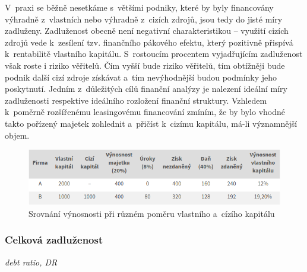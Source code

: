 V~praxi se běžně nesetkáme s~většími podniky, které by byly financovány výhradně z~vlastních nebo výhradně z~cizích zdrojů, jsou tedy do jisté míry zadluženy. Zadluženost obecně není negativní charakteristikou -- využití cizích zdrojů vede k~zesílení tzv. finančního pákového efektu, který pozitivně přispívá k~rentabilitě vlastního kapitálu.\cite{kisling} S~rostoucím procentem vyjadřujícím zadluženost však roste i riziko věřitelů. Čím vyšší bude riziko věřitelů, tím obtížněji bude podnik další cizí zdroje získávat a~tím nevýhodnější budou podmínky jeho poskytnutí.\cite{mendelu} Jedním z~důležitých cílů finanční analýzy je nalezení ideální míry zadluženosti respektive ideálního rozložení finanční struktury. Vzhledem k~poměrně rozšířenému leasingovému financování zmíním, že by bylo vhodné takto pořízený majetek zohlednit a~přičíst k~cizímu kapitálu, má-li významnější objem.

\begin{figure}
  \centering
  \includegraphics[width=15cm]{img/tab.png}
  \caption{Srovnání výnosnosti při různém poměru vlastního a~cízího kapitálu}
\end{figure}



\subsubsection{Celková zadluženost}
\textit{debt ratio, DR}

